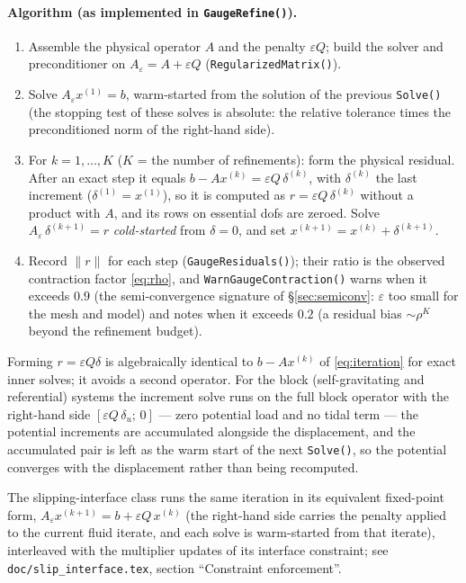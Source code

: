 \documentclass[11pt]{article}
\newcommand{\eps}{\varepsilon}
\newcommand{\norm}[1]{\lVert #1 \rVert}
\begin{document}
\paragraph{Algorithm (as implemented in \texttt{GaugeRefine()}).}
\begin{enumerate}
\item Assemble the physical operator $A$ and the penalty $\eps Q$; build
  the solver and preconditioner on $A_{\eps} = A + \eps Q$
  (\texttt{RegularizedMatrix()}).
\item Solve $A_{\eps} x^{(1)} = b$, warm-started from the solution of
  the previous \texttt{Solve()} (the stopping test of these solves is
  absolute: the relative tolerance times the preconditioned norm of the
  right-hand side).
\item For $k = 1, \dots, K$ ($K$ = the number of refinements): form the
  physical residual. After an exact step it equals
  $b - A x^{(k)} = \eps Q\,\delta^{(k)}$, with $\delta^{(k)}$ the last
  increment ($\delta^{(1)} = x^{(1)}$), so it is computed as
  $r = \eps Q\,\delta^{(k)}$ without a product with $A$, and its rows on
  essential dofs are zeroed. Solve $A_{\eps}\, \delta^{(k+1)} = r$
  \emph{cold-started} from $\delta = 0$, and set
  $x^{(k+1)} = x^{(k)} + \delta^{(k+1)}$.
\item Record $\norm{r}$ for each step (\texttt{GaugeResiduals()}); their
  ratio is the observed contraction factor \eqref{eq:rho}, and
  \texttt{WarnGaugeContraction()} warns when it exceeds $0.9$ (the
  semi-convergence signature of \S\ref{sec:semiconv}: $\eps$ too small
  for the mesh and model) and notes when it exceeds $0.2$ (a residual
  bias $\sim\rho^{K}$ beyond the refinement budget).
\end{enumerate}
Forming $r = \eps Q\delta$ is algebraically identical to $b - Ax^{(k)}$
of \eqref{eq:iteration} for exact inner solves; it avoids a second
operator. For the block (self-gravitating and referential) systems the
increment solve runs on the full block operator with the right-hand side
$[\eps Q\,\delta_{u};\, 0]$ --- zero potential load and no tidal term ---
the potential increments are accumulated alongside the displacement, and
the accumulated pair is left as the warm start of the next
\texttt{Solve()}, so the potential converges with the displacement rather
than being recomputed.

The slipping-interface class runs the same iteration in its equivalent
fixed-point form, $A_{\eps} x^{(k+1)} = b + \eps Q\, x^{(k)}$ (the
right-hand side carries the penalty applied to the current fluid iterate,
and each solve is warm-started from that iterate), interleaved with the
multiplier updates of its interface constraint; see
\texttt{doc/slip\_interface.tex}, section ``Constraint enforcement''.
\end{document}

